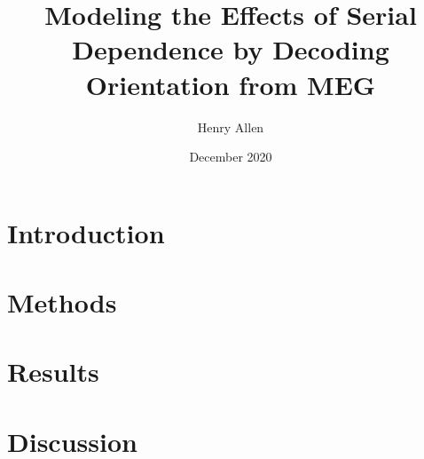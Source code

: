 \documentclass[a4paper,man]{apa6}
\begin{document}
\title{Modeling the Effects of Serial Dependence by Decoding Orientation from MEG}
\author{Henry Allen }
\date{December 2020}


\maketitle

\section{Introduction}


\section{Methods}


\section{Results}


\section{Discussion}





\end{document}
